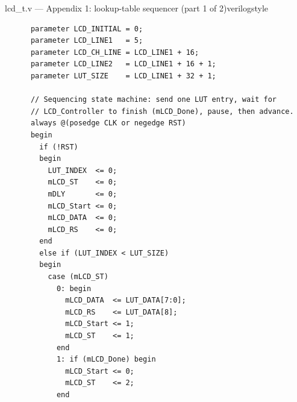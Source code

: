\begin{procedure}
\begin{codepanel}{lcd\_t.v --- Appendix 1: lookup-table sequencer (part 1 of 2)}{verilogstyle}
\begin{lstlisting}
      parameter LCD_INITIAL = 0;
      parameter LCD_LINE1   = 5;
      parameter LCD_CH_LINE = LCD_LINE1 + 16;
      parameter LCD_LINE2   = LCD_LINE1 + 16 + 1;
      parameter LUT_SIZE    = LCD_LINE1 + 32 + 1;

      // Sequencing state machine: send one LUT entry, wait for
      // LCD_Controller to finish (mLCD_Done), pause, then advance.
      always @(posedge CLK or negedge RST)
      begin
        if (!RST)
        begin
          LUT_INDEX  <= 0;
          mLCD_ST    <= 0;
          mDLY       <= 0;
          mLCD_Start <= 0;
          mLCD_DATA  <= 0;
          mLCD_RS    <= 0;
        end
        else if (LUT_INDEX < LUT_SIZE)
        begin
          case (mLCD_ST)
            0: begin
              mLCD_DATA  <= LUT_DATA[7:0];
              mLCD_RS    <= LUT_DATA[8];
              mLCD_Start <= 1;
              mLCD_ST    <= 1;
            end
            1: if (mLCD_Done) begin
              mLCD_Start <= 0;
              mLCD_ST    <= 2;
            end
    \end{lstlisting}
  \end{codepanel}


\end{procedure}
